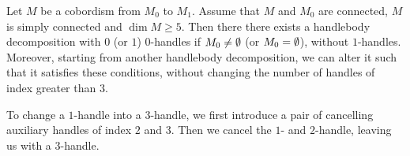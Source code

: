 \begin{prop}
    Let $M$ be a cobordism from $M_0$ to $M_1$.
    Assume that $M$ and  $M_0$ are connected, $M$ is simply connected and $\dim M \ge 5$.
    Then there there exists a handlebody decomposition with $0$ (or  $1$) $0$-handles if $M_0 \neq \emptyset$ (or $M_0 = \emptyset$), without $1$-handles.
    Moreover, starting from another handlebody decomposition, we can alter it such that it satisfies these conditions, without changing the number of handles of index greater than $3$.
    \label{thm:one-to-three}
\end{prop}
\begin{marginfigure}
    \centering
    \caption{
        To change a $1$-handle into a $3$-handle, we first introduce a pair of cancelling auxiliary handles of index $2$ and $3$. 
        Then we cancel the $1$- and $2$-handle, leaving us with a  $3$-handle.
    }
    \label{fig:changing-one-handles-in-three-handles}
\end{marginfigure}
